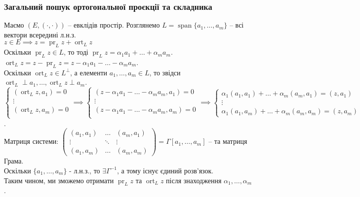 \documentclass[a4paper, 10pt]{article}
\theoremstyle{theoremdd}
\DeclareMathOperator{\linspan}{span}
\DeclareMathOperator{\ort}{ort}
\DeclareMathOperator{\pr}{pr}
\begin{document}
\subsubsection*{Загальний пошук ортогональної проєкції та складника}
Маємо $(E,(\cdot, \cdot))$ -- евклідів простір. Розглянемо $L = \linspan\{a_1,\dots,a_m\}$ -- всі вектори всередині л.н.з.\\
$z \in E \implies z = \pr_L z + \ort_L z$\\
Оскільки $\pr_L z \in L$, то тоді $\pr_L z = \alpha_1 a_1 + \dots + \alpha_m a_m$.\\
$\ort_L z = z - \pr_L z = \displaystyle z - \alpha_1 a_1 - \dots - \alpha_m a_m$.\\
Оскільки $\ort_L z \in L^\perp$, а елементи $a_1,\dots,a_m \in L$, то звідси $\ort_L \perp a_1, \dots, \ort_L z \perp a_m$.\\
$\begin{cases}
(\ort_L z, a_1) = 0 \\
\vdots \\
(\ort_L z, a_m) = 0 \\
\end{cases} \implies
\begin{cases}
(\displaystyle z - \alpha_1 a_1 - \dots - \alpha_m a_m, a_1) = 0 \\
\vdots \\
(\displaystyle z - \alpha_1 a_1 - \dots - \alpha_m a_m,a_m) = 0 \\
\end{cases} \implies
\begin{cases}
\alpha_1 (a_1,a_1) + \dots + \alpha_m (a_m,a_1) = (z,a_1) \\
\vdots \\
\alpha_1 (a_1,a_m) + \dots + \alpha_m (a_m,a_m) = (z,a_m)
\end{cases}
$.\\
Матриця системи: $\begin{pmatrix}
 (a_1,a_1) & \dots & (a_m,a_1) \\
 \vdots & \ddots & \vdots \\
 (a_1,a_m) & \dots & (a_m,a_m)
\end{pmatrix} = \Gamma[a_1,\dots,a_m]$ -- та матриця Грама.\\
Оскільки $\{a_1,\dots,a_m\}$ - л.н.з., то $\exists \Gamma^{-1}$, а тому існує єдиний розв'язок.\\
Таким чином, ми зможемо отримати $\pr_L z$ та $\ort_L z$ після знаходження $\alpha_1,\dots,\alpha_m$.
\end{document}

